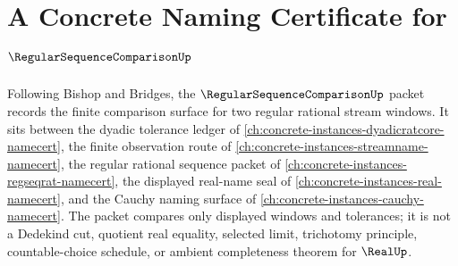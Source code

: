 \chapter{A Concrete Naming Certificate for $\RegularSequenceComparisonUp$}
\label{ch:concrete-instances-regular-sequence-comparison-namecert}

Following Bishop and Bridges, the $\RegularSequenceComparisonUp$ packet records the finite comparison surface for two regular rational stream windows. It sits between the dyadic tolerance ledger of \autoref{ch:concrete-instances-dyadicratcore-namecert}, the finite observation route of \autoref{ch:concrete-instances-streamname-namecert}, the regular rational sequence packet of \autoref{ch:concrete-instances-regseqrat-namecert}, the displayed real-name seal of \autoref{ch:concrete-instances-real-namecert}, and the Cauchy naming surface of \autoref{ch:concrete-instances-cauchy-namecert}. The packet compares only displayed windows and tolerances; it is not a Dedekind cut, quotient real equality, selected limit, trichotomy principle, countable-choice schedule, or ambient completeness theorem for $\RealUp$.

